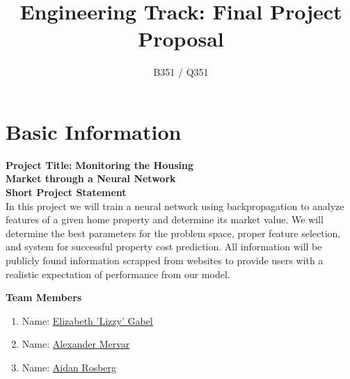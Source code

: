 \documentclass[]{article}
\title{\vspace{-2.5cm}Engineering Track: Final Project Proposal}
\author{B351 / Q351}
\date{}
\begin{document}
\maketitle

\section*{Basic Information}

\begin{multicols}{2}
	
\textbf{Project Title:} {\textbf{Monitoring the Housing\\
 Market through a Neural Network}}\\

\vspace{0.25cm}
\textbf{Short Project Statement}\\
In this project we will train a neural network using backpropagation to analyze features of a given home property and determine its market value.  We will determine the best parameters for the problem space, proper feature selection, and system for successful property cost prediction.  All information will be publicly found information scrapped from websites to provide users with a realistic expectation of performance from our model.

\columnbreak
\textbf{Team Members}
\begin{enumerate}
	
	\vspace{0.5cm}
	\item Name: \underline{Elizabeth 'Lizzy' Gabel}
	
	\vspace{0.25cm}
	\item Name: \underline{Alexander Mervar}
	
	\vspace{0.25cm}
	\item Name: \underline{Aidan Rosberg}
	
	
\end{enumerate}

\end{multicols}
\end{document}
